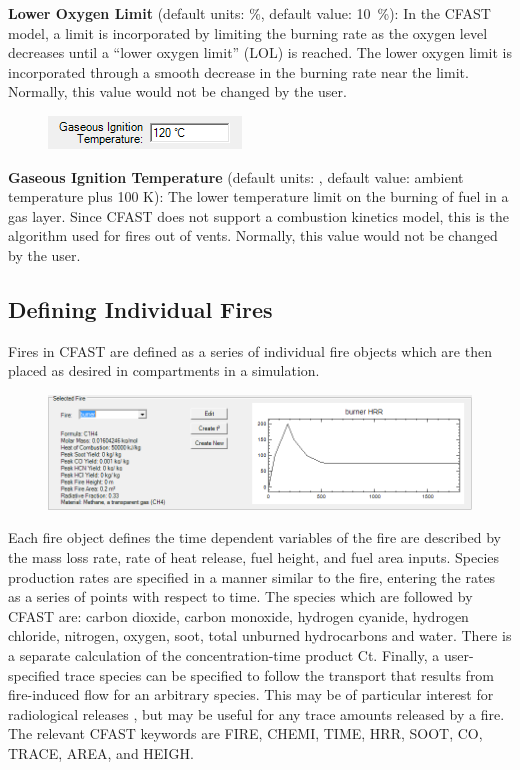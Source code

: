 \textbf{Lower Oxygen Limit} (default units: \%, default value: 10~\%):  In the CFAST model, a limit is incorporated by limiting the burning rate as the oxygen level decreases until a ``lower oxygen limit'' (LOL) is reached. The lower oxygen limit is incorporated through a smooth decrease in the burning rate near the limit. Normally, this value would not be changed by the user.

\begin{figure}
  \includegraphics[width=2.021in]{FIGURES/Input_File/Gaseous_Ignition_Temperature}
\end{figure}

\textbf{Gaseous Ignition Temperature} (default units: \degc, default value: ambient temperature plus 100 K): The lower temperature limit on the burning of fuel in a gas layer. Since CFAST does not support a combustion kinetics model, this is the algorithm used for fires out of vents.  Normally, this value would not be changed by the user.

\subsection{Defining Individual Fires}

Fires in CFAST are defined as a series of individual fire objects which are then placed as desired in compartments in a simulation.

\begin{figure}[h!]
\begin{center}
\includegraphics[width=6.5in]{FIGURES/Input_File/Fire_Object_Plot}
\end{center}
\end{figure}

Each fire object defines the time dependent variables of the fire are described by the mass loss rate, rate of heat release, fuel height, and fuel area inputs.  Species production rates are specified in a manner similar to the fire, entering the rates as a series of points with respect to time.  The species which are followed by CFAST are: carbon dioxide, carbon monoxide, hydrogen cyanide, hydrogen chloride, nitrogen, oxygen, soot, total unburned hydrocarbons and water. There is a separate calculation of the concentration-time product Ct. Finally, a user-specified trace species can be specified to follow the transport that results from fire-induced flow for an arbitrary species. This may be of particular interest for radiological releases \cite{Jones:2008}, but may be useful for any trace amounts released by a fire. The relevant CFAST keywords are FIRE, CHEMI, TIME, HRR, SOOT, CO, TRACE, AREA, and HEIGH.


